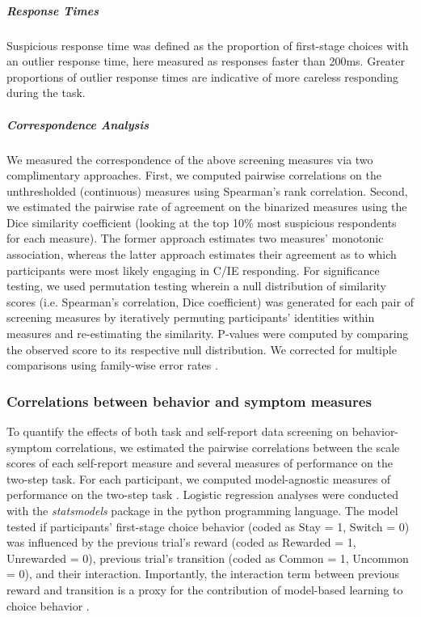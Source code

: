 \documentclass[a4paper,notitlepage,12pt]{article}
\begin{document}
\begin{refsection}[supp]
\subparagraph{Response Times} Suspicious response time was defined as the proportion of first-stage choices with an outlier response time, here measured as responses faster than 200ms. Greater proportions of outlier response times are indicative of more careless responding during the task.  

\subparagraph{Correspondence Analysis} We measured the correspondence of the above screening measures via two complimentary approaches. First, we computed pairwise correlations on the unthresholded (continuous) measures using Spearman's rank correlation. Second, we estimated the pairwise rate of agreement on the binarized measures using the Dice similarity coefficient (looking at the top 10\% most suspicious respondents for each measure). The former approach estimates two measures' monotonic association, whereas the latter approach estimates their agreement as to which participants were most likely engaging in C/IE responding. For significance testing, we used permutation testing wherein a null distribution of similarity scores (i.e. Spearman's correlation, Dice coefficient) was generated for each pair of screening measures by iteratively permuting participants' identities within measures and re-estimating the similarity. P-values were computed by comparing the observed score to its respective null distribution. We corrected for multiple comparisons using family-wise error rates \cite{winkler2014permutation-2}.

\subsubsection*{Correlations between behavior and symptom measures}

To quantify the effects of both task and self-report data screening on behavior-symptom correlations, we estimated the pairwise correlations between the scale scores of each self-report measure and several measures of performance on the two-step task. For each participant, we computed model-agnostic measures of performance on the two-step task \cite{gillan2016characterizing}. Logistic regression analyses were conducted with the \textit{statsmodels} package \cite{seabold2010statsmodels} in the python programming language. The model tested if participants' first-stage choice behavior (coded as Stay = 1, Switch = 0) was influenced by the previous trial's reward (coded as Rewarded = 1, Unrewarded = 0), previous trial's transition (coded as Common = 1, Uncommon = 0), and their interaction. Importantly, the interaction term between previous reward and transition is a proxy for the contribution of model-based learning to choice behavior \cite{gillan2016characterizing}.


\end{refsection}
\end{document}
